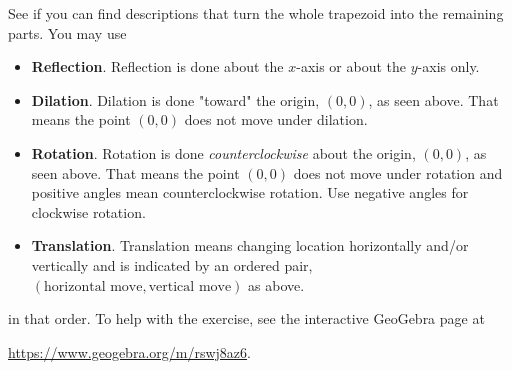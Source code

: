 See if you can find descriptions that turn the whole trapezoid into the remaining parts. You may use
\begin{itemize}
    \item \textbf{Reflection}. Reflection is done about the $x$-axis or about the $y$-axis only.
    \item \textbf{Dilation}. Dilation is done "toward" the origin, $(0,0)$, as seen above. That means the point $(0,0)$ does not move under dilation.
    \item \textbf{Rotation}. Rotation is done \textit{counterclockwise} about the origin, $(0,0)$, as seen above. That means the point $(0,0)$ does not move under rotation and positive angles mean counterclockwise rotation. Use negative angles for clockwise rotation.
    \item \textbf{Translation}. Translation means changing location horizontally and/or vertically and is indicated by an ordered pair, $(\text{horizontal move},\text{vertical move})$ as above.
\end{itemize}
in that order. To help with the exercise, see the interactive GeoGebra page at 
\begin{center}\hyperlink{https://www.geogebra.org/m/rswj8az6}{https://www.geogebra.org/m/rswj8az6}.\end{center}
